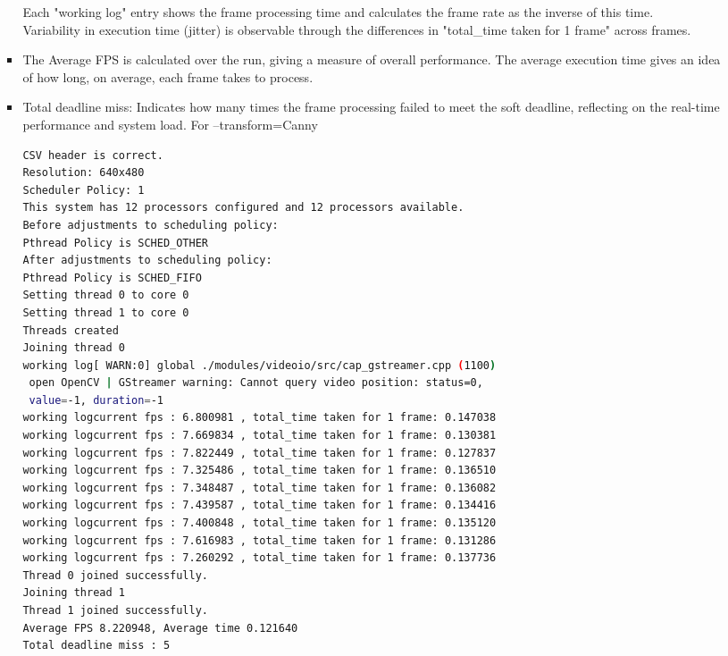 \documentclass[a4paper,11pt]{article}%
\newenvironment{qanda}{\setlength{\parindent}{0pt}}{\bigskip}
\begin{document}
\begin{qanda}
\begin{enumerate}
\begin{enumerate}
\begin{itemize}
					            Each "working log" entry shows the frame processing time and calculates the frame rate as the inverse of this time.\\
					            Variability in execution time (jitter) is observable through the differences in "total\_time taken for 1 frame" across frames.\\
					      \item  The Average FPS is calculated over the run, giving a measure of overall performance. The average execution time gives an idea of how long, on average, each frame takes to process.
					      \item Total deadline miss: Indicates how many times the frame processing failed to meet the soft deadline, reflecting on the real-time performance and system load.
					            For --transform=Canny
					            \begin{lstlisting}[language=sh]
CSV header is correct.
Resolution: 640x480
Scheduler Policy: 1
This system has 12 processors configured and 12 processors available.
Before adjustments to scheduling policy:
Pthread Policy is SCHED_OTHER
After adjustments to scheduling policy:
Pthread Policy is SCHED_FIFO
Setting thread 0 to core 0
Setting thread 1 to core 0
Threads created 
Joining thread 0
working log[ WARN:0] global ./modules/videoio/src/cap_gstreamer.cpp (1100)
 open OpenCV | GStreamer warning: Cannot query video position: status=0, 
 value=-1, duration=-1
working logcurrent fps : 6.800981 , total_time taken for 1 frame: 0.147038 
working logcurrent fps : 7.669834 , total_time taken for 1 frame: 0.130381 
working logcurrent fps : 7.822449 , total_time taken for 1 frame: 0.127837 
working logcurrent fps : 7.325486 , total_time taken for 1 frame: 0.136510 
working logcurrent fps : 7.348487 , total_time taken for 1 frame: 0.136082 
working logcurrent fps : 7.439587 , total_time taken for 1 frame: 0.134416 
working logcurrent fps : 7.400848 , total_time taken for 1 frame: 0.135120 
working logcurrent fps : 7.616983 , total_time taken for 1 frame: 0.131286 
working logcurrent fps : 7.260292 , total_time taken for 1 frame: 0.137736 
Thread 0 joined successfully.
Joining thread 1
Thread 1 joined successfully.
Average FPS 8.220948, Average time 0.121640 
Total deadline miss : 5
\end{lstlisting}


\end{itemize}
\end{enumerate}
\end{enumerate}
\end{qanda}
\end{document}
